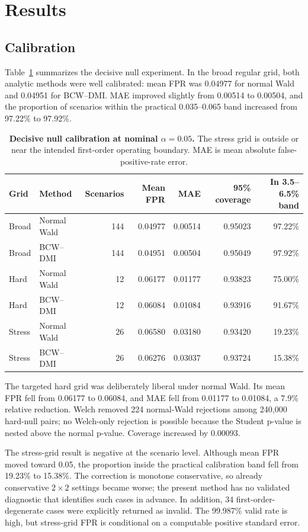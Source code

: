 \documentclass[10pt,twocolumn]{article}
\newcommand{\method}{BCW--DMI}
\begin{document}
\section{Results}

\subsection{Calibration}

Table~\ref{tab:calibration} summarizes the decisive null experiment. In the
broad regular grid, both analytic methods were well calibrated: mean FPR was
0.04977 for normal Wald and 0.04951 for \method. MAE improved slightly from
0.00514 to 0.00504, and the proportion of scenarios within the practical
0.035--0.065 band increased from 97.22\% to 97.92\%.

\begin{table}[t]
\centering
\caption{\textbf{Decisive null calibration at nominal \(\alpha=0.05\).}
The stress grid is outside or near the intended first-order operating
boundary. MAE is mean absolute false-positive-rate error.}
\label{tab:calibration}
\small
\begin{tabular}{@{}llrrrrr@{}}
\toprule
Grid & Method & Scenarios & Mean FPR & MAE & 95\% coverage & In 3.5--6.5\% band\\
\midrule
Broad & Normal Wald & 144 & 0.04977 & 0.00514 & 0.95023 & 97.22\%\\
Broad & \method & 144 & 0.04951 & 0.00504 & 0.95049 & 97.92\%\\
\addlinespace
Hard & Normal Wald & 12 & 0.06177 & 0.01177 & 0.93823 & 75.00\%\\
Hard & \method & 12 & 0.06084 & 0.01084 & 0.93916 & 91.67\%\\
\addlinespace
Stress & Normal Wald & 26 & 0.06580 & 0.03180 & 0.93420 & 19.23\%\\
Stress & \method & 26 & 0.06276 & 0.03037 & 0.93724 & 15.38\%\\
\bottomrule
\end{tabular}
\end{table}

The targeted hard grid was deliberately liberal under normal Wald. Its mean
FPR fell from 0.06177 to 0.06084, and MAE fell from 0.01177 to 0.01084, a
7.9\% relative reduction. Welch removed 224 normal-Wald rejections among
240,000 hard-null pairs; no Welch-only rejection is possible because the
Student p-value is nested above the normal p-value. Coverage increased by
0.00093.

The stress-grid result is negative at the scenario level. Although mean FPR
moved toward 0.05, the proportion inside the practical calibration band fell
from 19.23\% to 15.38\%. The correction is monotone conservative, so already
conservative \(2\times2\) settings became worse; the present method has no
validated diagnostic that identifies such cases in advance. In addition, 34
first-order-degenerate cases were explicitly returned as invalid. The
99.987\% valid rate is high, but stress-grid FPR is conditional on a
computable positive standard error.
\end{document}
